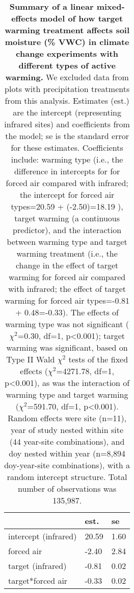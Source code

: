 \documentclass{article}
\begin{document}
\begin{table}[ht]
\centering
\caption{\textbf{Summary of a linear mixed-effects model of how target warming treatment affects soil moisture (\% VWC) in climate change experiments with different types of active warming.} We excluded data from plots with precipitation treatments from this analysis. Estimates (est.) are the intercept (representing infrared sites) and coefficients from the model; se is the standard error for these estimates. Coefficients include: warming type (i.e., the difference in intercepts for for forced air compared with infrared; the intercept for forced air types=20.59 + (-2.50)=18.19 ), target warming (a continuous predictor), and the interaction between warming type and target warming treatment (i.e., the change in the effect of target warming for forced air compared with infrared; the effect of target warming for forced air types=-0.81 + 0.48=-0.33). The effects of warming type was not significant ($\chi^{2}$=0.30, df=1, p<0.001); target warming was significant, based on Type II Wald $\chi^{2}$ tests of the fixed effects ($\chi^{2}$=4271.78, df=1, p<0.001), as was the interaction of warming type and target warming ($\chi^{2}$=591.70, df=1, p<0.001). Random effects were site (n=11), year of study nested within site (44 year-site combinations), and doy nested within year (n=8,894 doy-year-site combinations), with a random intercept structure. Total number of observations was 135,987.} 
\label{table:targsoilmois}
\begingroup\footnotesize
\begin{tabular}{|p{}|p{}p{}|}
  \hline
 & est. & se \\ 
  \hline
intercept (infrared) & 20.59 & 1.60 \\ 
  forced air & -2.40 & 2.84 \\ 
  target (infrared) & -0.81 & 0.02 \\ 
  target*forced air & -0.33 & 0.02 \\ 
   \hline
\end{tabular}
\endgroup
\end{table}\clearpage
\end{document}
